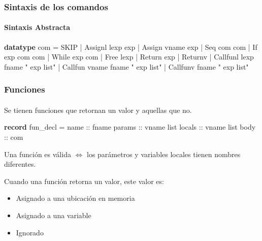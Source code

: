\begin{frame}[fragile]
\frametitle{Sintaxis de los comandos}
\framesubtitle{Sintaxis Abstracta}

\begin{semiverbatim}
\textbf{datatype} com = SKIP
             | Assignl lexp exp
             | Assign  vname exp
             | Seq     com  com
             | If      exp com com
             | While   exp com
             | Free    lexp
             | Return exp
             | Returnv
             | Callfunl lexp fname " exp list"
             | Callfun vname fname " exp list"
             | Callfunv fname " exp list"
\end{semiverbatim}

\end{frame}


\begin{frame}[fragile]
\frametitle{Funciones}
\framesubtitle{}

Se tienen funciones que retornan un valor y aquellas que no.

\begin{semiverbatim}
\textbf{record} fun_decl =
  name :: fname
  params :: vname list
  locals :: vname list
  body :: com
\end{semiverbatim}

\bigskip

Una función es válida $\Longleftrightarrow$ los parámetros y variables locales tienen nombres diferentes.

\bigskip

Cuando una función retorna un valor, este valor es:

\begin{itemize}
\item{Asignado a una ubicación en memoria}
\item{Asignado a una variable}
\item{Ignorado}
\end{itemize}


\end{frame}


